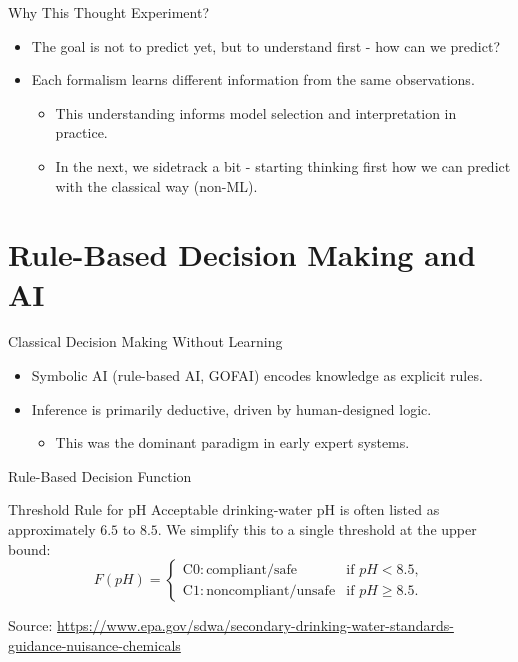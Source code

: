 \documentclass[10pt]{beamer}
\newcommand{\sourcesnote}[1]{{\footnotesize\color{footnotepurple}#1}}
\begin{document}
\begin{frame}{Why This Thought Experiment?}
    \justifying
    \begin{itemize}
        \item The goal is not to predict yet, but to understand first - how can we predict?
        \item Each formalism learns different information from the same observations.
        \begin{itemize}
            \item This understanding informs model selection and interpretation in practice.
            \item In the next, we sidetrack a bit - starting thinking first how we can predict with the classical way (non-ML).
        \end{itemize}
    \end{itemize}
\end{frame}

\section{Rule-Based Decision Making and AI}

\begin{frame}{Classical Decision Making Without Learning}
    \justifying
    \begin{itemize}
        \item Symbolic AI (rule-based AI, GOFAI) encodes knowledge as explicit rules.
        \item Inference is primarily deductive, driven by human-designed logic.
        \begin{itemize}
            \item This was the dominant paradigm in early expert systems.
        \end{itemize}
    \end{itemize}
\end{frame}

\begin{frame}{Rule-Based Decision Function}
    \justifying
    \begin{examplebox}{Threshold Rule for pH}
        Acceptable drinking-water pH is often listed as approximately $6.5$ to $8.5$.
        We simplify this to a single threshold at the upper bound:
        \[
          F(pH) = \left\{
            \begin{array}{ll}
              \mathrm{C0: compliant/safe} & \text{if } pH < 8.5, \\
              \mathrm{C1: noncompliant/unsafe} & \text{if } pH \geq 8.5.
            \end{array}
          \right.
        \]
    \end{examplebox}
    \vspace{0.5em}
    \sourcesnote{Source: \url{https://www.epa.gov/sdwa/secondary-drinking-water-standards-guidance-nuisance-chemicals}}
\end{frame}
\end{document}
